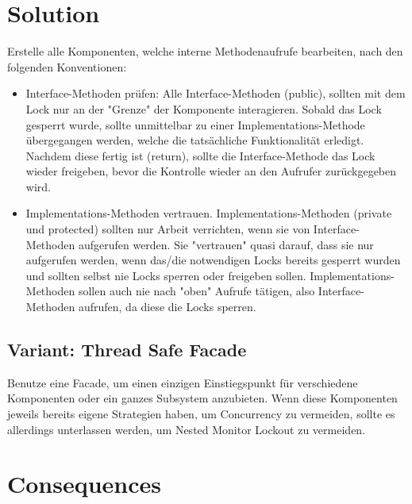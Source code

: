 \section{Solution}
Erstelle alle Komponenten, welche interne Methodenaufrufe bearbeiten, nach den folgenden Konventionen:
\begin{itemize}
  \item Interface-Methoden prüfen: Alle Interface-Methoden (public), sollten mit dem Lock nur an der "Grenze" der Komponente interagieren. Sobald das Lock gesperrt wurde, sollte unmittelbar zu einer Implementations-Methode übergegangen werden, welche die tatsächliche Funktionalität erledigt. Nachdem diese fertig ist (return), sollte die Interface-Methode das Lock wieder freigeben, bevor die Kontrolle wieder an den Aufrufer zurückgegeben wird.
  \item Implementations-Methoden vertrauen. Implementations-Methoden (private und protected) sollten nur Arbeit verrichten, wenn sie von Interface-Methoden aufgerufen werden. Sie "vertrauen" quasi darauf, dass sie nur aufgerufen werden, wenn das/die notwendigen Locks bereits gesperrt wurden und sollten selbst nie Locks sperren oder freigeben sollen. Implementations-Methoden sollen auch nie nach "oben" Aufrufe tätigen, also Interface-Methoden aufrufen, da diese die Locks sperren.
\end{itemize}

\subsection{Variant: Thread Safe Facade}
Benutze eine Facade, um einen einzigen Einstiegspunkt für verschiedene Komponenten oder ein ganzes Subsystem anzubieten. Wenn diese Komponenten jeweils bereits eigene Strategien haben, um Concurrency zu vermeiden, sollte es allerdings unterlassen werden, um Nested Monitor Lockout zu vermeiden.

\section{Consequences}
\begin{itemize}
\end{itemize}


